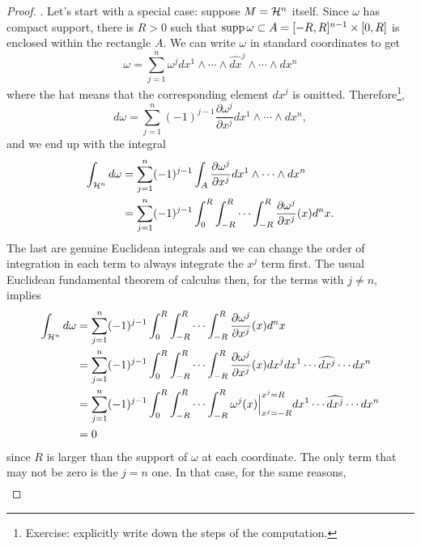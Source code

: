 \begin{proof}
	.
	Let's start with a special case: suppose $M = \mathcal{H}^n$ itself.
	Since $\omega$ has compact support, there is $R > 0$ such that $\operatorname{supp} \omega \subset A = [-R,R]^{n-1}\times[0,R]$ is enclosed within the rectangle $A$.
	We can write $\omega$ in standard coordinates to get
	\begin{equation}
		\omega = \sum_{j=1}^n \omega^j dx^1 \wedge \cdots\wedge \widehat{dx}^j \wedge \cdots\wedge dx^n
	\end{equation}
	where the hat means that the corresponding element $dx^j$ is omitted.
	Therefore\footnote{Exercise: explicitly write down the steps of the computation.},
	\begin{equation}
		d\omega = \sum_{j=1}^n (-1)^{j-1} \frac{\partial \omega^j}{\partial x^j}dx^1\wedge\cdots\wedge dx^n,
	\end{equation}
	and we end up with the integral
	\begin{align}
		\int_{\cH^n} d\omega
		 & = \sum_{j=1}^n (-1)^{j-1} \int_A\frac{\partial \omega^j}{\partial x^j}dx^1\wedge\cdots\wedge dx^n                \\
		 & = \sum_{j=1}^n (-1)^{j-1} \int_0^R\int_{-R}^R\cdots\int_{-R}^{R}\frac{\partial \omega^j}{\partial x^j}(x) d^n x. %
	\end{align}
	The last are genuine Euclidean integrals and we can change the order of integration in each term to always integrate the $x^j$ term first.
	The usual Euclidean fundamental theorem of calculus then, for the terms with $j\neq n$, implies
	\begin{align}
		\int_{\cH^n} d\omega
		 & = \sum_{j=1}^n (-1)^{j-1} \int_0^R\int_{-R}^R\cdots\int_{-R}^{R}\frac{\partial \omega^j}{\partial x^j}(x) d^n x                                   \\ %
		 & =\sum_{j=1}^n (-1)^{j-1} \int_0^R\int_{-R}^R\cdots\int_{-R}^{R}\frac{\partial \omega^j}{\partial x^j}(x) dx^j dx^1\cdots\widehat{dx^j}\cdots dx^n \\
		 & =\sum_{j=1}^n (-1)^{j-1} \int_0^R\int_{-R}^R\cdots\int_{-R}^{R}\omega^j(x) \Big|_{x^j=-R}^{x^j=R} dx^1\cdots\widehat{dx^j}\cdots dx^n             \\
		 & = 0
	\end{align}
	since $R$ is larger than the support of $\omega$ at each coordinate.
	The only term that may not be zero is the $j=n$ one.
	In that case, for the same reasons,
	\begin{align}

\end{align}
\end{proof}
